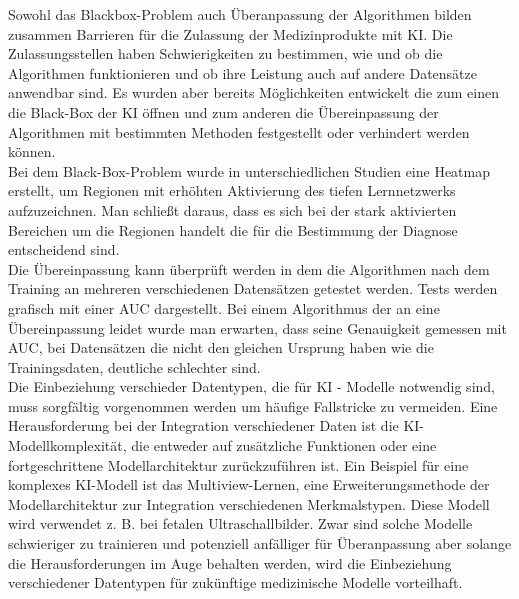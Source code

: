 Sowohl das Blackbox-Problem auch Überanpassung der Algorithmen bilden zusammen Barrieren für die Zulassung der Medizinprodukte mit KI. Die Zulassungsstellen haben Schwierigkeiten zu bestimmen, wie und ob die Algorithmen funktionieren und ob ihre Leistung auch auf andere Datensätze anwendbar sind.\cite{AI_where_are_we_now} Es wurden aber bereits Möglichkeiten entwickelt die zum einen die Black-Box der KI öffnen und zum anderen die Übereinpassung der Algorithmen mit bestimmten Methoden festgestellt oder verhindert werden können.\cite{AI_where_are_we_now} \\

Bei dem Black-Box-Problem wurde in unterschiedlichen Studien eine Heatmap erstellt, um Regionen mit erhöhten Aktivierung des tiefen Lernnetzwerks aufzuzeichnen. Man schließt daraus, dass es sich bei der stark aktivierten Bereichen um die Regionen handelt die für die Bestimmung der Diagnose entscheidend sind.\cite{AI_where_are_we_now}\\
Die Übereinpassung kann überprüft werden in dem die Algorithmen nach dem Training an mehreren verschiedenen Datensätzen getestet werden.\cite{AI_where_are_we_now} Tests werden grafisch mit einer AUC dargestellt. Bei einem Algorithmus der an eine Übereinpassung leidet wurde man erwarten, dass seine Genauigkeit gemessen mit AUC, bei Datensätzen die nicht den gleichen Ursprung haben wie die Trainingsdaten, deutliche schlechter sind.\cite{AI_where_are_we_now}\\

Die Einbeziehung verschieder Datentypen, die für KI - Modelle notwendig sind, muss sorgfältig vorgenommen werden um häufige Fallstricke zu vermeiden. Eine Herausforderung bei der Integration verschiedener Daten ist die KI-Modellkomplexität, die entweder auf zusätzliche Funktionen oder eine fortgeschrittene Modellarchitektur zurückzuführen ist. Ein Beispiel für eine komplexes KI-Modell ist das Multiview-Lernen, eine Erweiterungsmethode der Modellarchitektur zur Integration verschiedenen Merkmalstypen. Diese Modell wird verwendet z. B. bei fetalen Ultraschallbilder. Zwar sind solche Modelle schwieriger zu trainieren und potenziell anfälliger für Überanpassung aber solange die Herausforderungen im Auge behalten werden, wird die Einbeziehung verschiedener Datentypen für zukünftige medizinische Modelle vorteilhaft.\cite{The_missing_pieces}